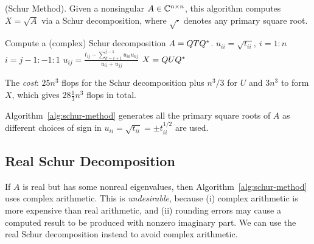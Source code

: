 \documentclass{article}
\begin{document}
\begin{algorithm}
  \caption{(Schur Method). Given a nonsingular $A\in\mathbb{C}^{n\times n}$, this algorithm
    computes $X = \sqrt{A}$ via a Schur decomposition, where $\sqrt{\cdot}$
    denotes any primary square root.}
  \label{alg:schur-method}
  \begin{algorithmic}[1]
    \State Compute a (complex) Schur decomposition $A = QTQ^{*}$. \State
    $u_{ii} = \sqrt{t_{ii}},\ i = 1:n$  \For
    {$i = j-1:-1:1$} \State
    $\displaystyle u_{ij} = \frac{t_{ij} -
      \sum_{k=i+1}^{j-1}u_{ik}u_{kj}}{u_{ii} + u_{jj}}$ \EndFor \EndFor
    \State $X = QUQ^{*}$
  \end{algorithmic}
\end{algorithm}

The \emph{cost}: $25n^3$ flops for the Schur decomposition plus $n^3/3$ for
$U$ and $3n^3$ to form $X$, which gives $28 \frac{1}{3}n^3$ flops in total.

Algorithm~\ref{alg:schur-method} generates all the primary square roots of
$A$ as different choices of sign in
$u_{ii} = \sqrt{t_{ii}} = \pm t_{ii}^{1/2}$ are used.

\subsection{Real Schur Decomposition}
If $A$ is real but has some nonreal eigenvalues, then
Algorithm~\ref{alg:schur-method} uses complex arithmetic. This is
\emph{undesirable}, because (i) complex arithmetic is more expensive than
real arithmetic, and (ii) rounding errors may cause a computed result to be
produced with nonzero imaginary part. We can use the real Schur
decomposition instead to avoid complex arithmetic.
\end{document}
